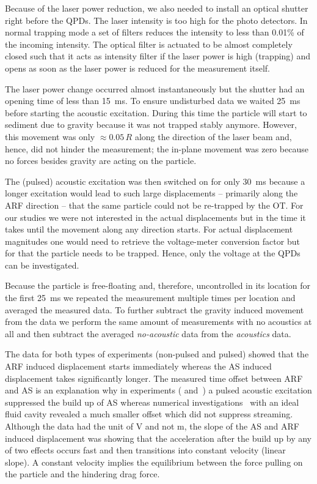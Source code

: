 Because of the laser power reduction, we also needed to install an optical 
shutter right before the QPDs. The laser intensity is too high for the photo 
detectors. In normal trapping mode a set of filters reduces the intensity to 
less than 0.01\% of the incoming intensity. The optical filter is actuated to 
be almost completely closed such that it acts as intensity filter if the laser 
power is high (trapping) and opens as soon as the laser power is reduced for 
the measurement itself.

The laser power change occurred almost instantaneously but the shutter had an 
opening time of less than \SI{15}{\ms}. To ensure undisturbed data we waited 
\SI{25}{\ms} before starting the acoustic excitation. During this time the 
particle will start to sediment due to gravity because it was not trapped 
stably anymore. However, this movement was only $\approx 0.05\,R$ along the 
direction of the laser beam and, hence, did not hinder the measurement; the 
in-plane movement was zero because no forces besides gravity are acting on the 
particle.

The (pulsed) acoustic excitation was then switched on for only \SI{30}{\ms} 
because a longer excitation would lead to such large displacements -- primarily 
along the ARF direction -- that the same particle could not be re-trapped by 
the OT. For our studies we were not interested in the actual displacements but 
in the time it takes until the movement along any direction starts. For actual 
displacement magnitudes one would need to retrieve the voltage-meter conversion 
factor but for that the particle needs to be trapped. Hence, only the voltage 
at the QPDs can be investigated.

Because the particle is free-floating and, therefore, uncontrolled in its 
location for the first \SI{25}{\ms} we repeated the measurement multiple times 
per location and averaged the measured data. To further subtract the gravity 
induced movement from the data we perform the same amount of measurements with 
no acoustics at all and then subtract the averaged \emph{no-acoustic} data from 
the \emph{acoustics} data.

The data for both types of experiments (non-pulsed and pulsed) showed that the 
ARF induced displacement starts immediately whereas the AS induced displacement 
takes significantly longer. The measured time offset between ARF and AS is an 
explanation why in experiments ( and~) a 
pulsed acoustic excitation suppressed the build up of AS whereas numerical 
investigations~ with an ideal fluid cavity revealed a much 
smaller offset which did not suppress streaming. Although the data had the unit 
of \si{\volt} and not \si{\meter}, the slope of the AS and ARF induced 
displacement was showing that the acceleration after the build up by any of two 
effects occurs fast and then transitions into constant velocity (linear slope).  
A constant velocity implies the equilibrium between the force pulling on the 
particle and the hindering drag force.

